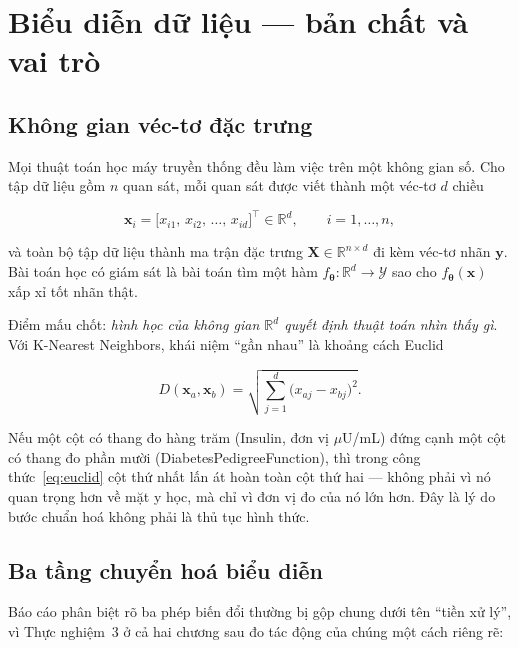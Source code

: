 \section{Biểu diễn dữ liệu --- bản chất và vai trò}
\label{sec:bieudien}

\subsection{Không gian véc-tơ đặc trưng}

Mọi thuật toán học máy truyền thống đều làm việc trên một không gian số. Cho
tập dữ liệu gồm $n$ quan sát, mỗi quan sát được viết thành một véc-tơ $d$ chiều

\begin{equation}
\mathbf{x}_i = \big[x_{i1},\, x_{i2},\, \dots,\, x_{id}\big]^{\!\top} \in \mathbb{R}^{d},
\qquad i = 1,\dots,n,
\label{eq:vector-dactrung}
\end{equation}

\noindent và toàn bộ tập dữ liệu thành ma trận đặc trưng
$\mathbf{X}\in\mathbb{R}^{n\times d}$ đi kèm véc-tơ nhãn $\mathbf{y}$. Bài toán
học có giám sát là bài toán tìm một hàm $f_{\bm\theta}:\mathbb{R}^{d}\to\mathcal{Y}$
sao cho $f_{\bm\theta}(\mathbf{x})$ xấp xỉ tốt nhãn thật.

Điểm mấu chốt: \emph{hình học của không gian $\mathbb{R}^{d}$ quyết định thuật
toán nhìn thấy gì}. Với K-Nearest Neighbors, khái niệm ``gần nhau'' là khoảng
cách Euclid

\begin{equation}
D(\mathbf{x}_a,\mathbf{x}_b)=\sqrt{\sum_{j=1}^{d}\big(x_{aj}-x_{bj}\big)^{2}}.
\label{eq:euclid}
\end{equation}

\noindent Nếu một cột có thang đo hàng trăm (Insulin, đơn vị $\mu$U/mL) đứng
cạnh một cột có thang đo phần mười (DiabetesPedigreeFunction), thì trong
công thức~\eqref{eq:euclid} cột thứ nhất lấn át hoàn toàn cột thứ hai --- không
phải vì nó quan trọng hơn về mặt y học, mà chỉ vì đơn vị đo của nó lớn hơn. Đây
là lý do bước chuẩn hoá không phải là thủ tục hình thức.

\subsection{Ba tầng chuyển hoá biểu diễn}
\label{sec:ba-tang-bieudien}

Báo cáo phân biệt rõ ba phép biến đổi thường bị gộp chung dưới tên ``tiền xử
lý'', vì Thực nghiệm~3 ở cả hai chương sau đo tác động của chúng một cách
riêng rẽ:

